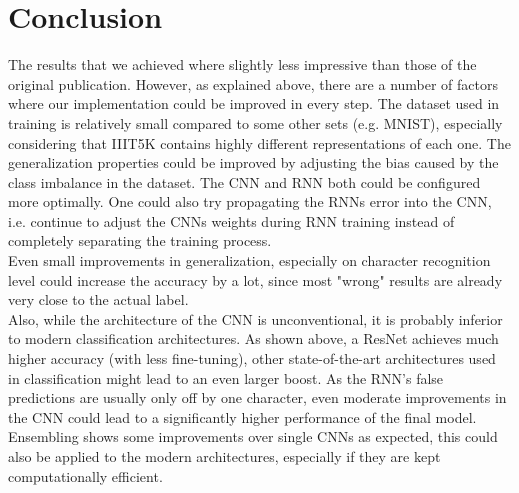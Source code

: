 \documentclass{utue} %
\begin{document}
\section{Conclusion}
The results that we achieved where slightly less impressive than those of the original publication. However, as explained above, there are a number of factors where our implementation could be improved in every step. The dataset used in training is relatively small compared to some other sets (e.g. MNIST), especially considering that IIIT5K contains highly different representations of each one. The generalization properties could be improved by adjusting the bias caused by the class imbalance in the dataset. The CNN and RNN both could be configured more optimally. One could also try propagating the RNNs error into the CNN, i.e. continue to adjust the CNNs weights during RNN training instead of completely separating the training process.\\
Even small improvements in generalization, especially on character recognition level could increase the accuracy by a lot, since most "wrong" results are already very close to the actual label.\\
Also, while the architecture of the CNN is unconventional, it is probably inferior to modern classification architectures. As shown above, a ResNet \cite{resnet1} achieves much higher accuracy (with less fine-tuning), other state-of-the-art architectures used in classification might lead to an even larger boost. As the RNN's false predictions are usually only off by one character, even moderate improvements in the CNN could lead to a significantly higher performance of the final model.\\
Ensembling shows some improvements over single CNNs as expected, this could also be applied to the modern architectures, especially if they are kept computationally efficient.
\end{document}
